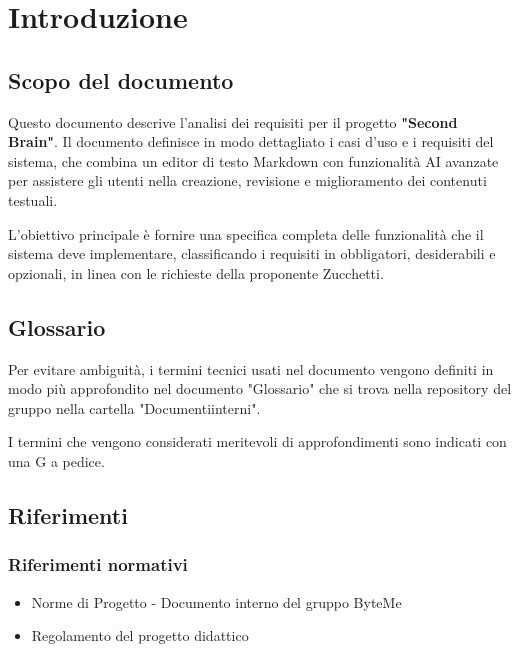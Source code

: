 \documentclass[11pt,a4paper]{article}
\begin{document}
\newpage

\tableofcontents
\thispagestyle{empty}
\newpage

\setcounter{page}{1}

\section{Introduzione}
\subsection{Scopo del documento}
Questo documento descrive l'analisi dei requisiti per il progetto \textbf{"Second Brain"}. Il documento definisce in modo dettagliato i casi d'uso e i requisiti del sistema, che combina un editor di testo Markdown con funzionalità AI avanzate per assistere gli utenti nella creazione, revisione e miglioramento dei contenuti testuali.

L'obiettivo principale è fornire una specifica completa delle funzionalità che il sistema deve implementare, classificando i requisiti in obbligatori, desiderabili e opzionali, in linea con le richieste della proponente Zucchetti.

\subsection{Glossario}
Per evitare ambiguità, i termini tecnici usati nel documento vengono definiti in modo più approfondito nel documento "Glossario" che si trova nella repository del gruppo nella cartella "Documenti\textunderscore interni".

I termini che vengono considerati meritevoli di approfondimenti sono indicati con una G a pedice.

\subsection{Riferimenti}
\subsubsection{Riferimenti normativi}
\begin{itemize}
    \item Norme di Progetto - Documento interno del gruppo ByteMe
    \item Regolamento del progetto didattico
\end{itemize}
\end{document}
